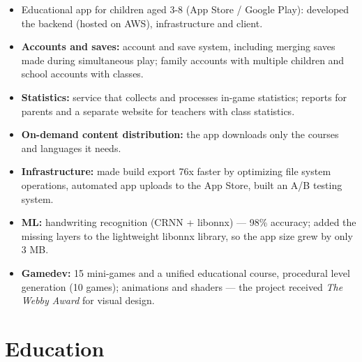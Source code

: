 \documentclass{dodiresume}
\begin{document}

\begin{itemize}
\item Educational app for children aged 3-8 (App Store / Google Play): developed the backend (hosted on AWS), infrastructure and client.
\item \textbf{Accounts and saves:} account and save system, including merging saves made during simultaneous play; family accounts with multiple children and school accounts with classes.
\item \textbf{Statistics:} service that collects and processes in-game statistics; reports for parents and a separate website for teachers with class statistics.
\item \textbf{On-demand content distribution:} the app downloads only the courses and languages it needs.
\item \textbf{Infrastructure:} made build export 76x faster by optimizing file system operations, automated app uploads to the App Store, built an A/B testing system.
\item \textbf{ML:} handwriting recognition (CRNN + libonnx) — 98\% accuracy; added the missing layers to the lightweight libonnx library, so the app size grew by only 3 MB.
\item \textbf{Gamedev:} 15 mini-games and a unified educational course, procedural level generation (10 games); animations and shaders — the project received \textit{The Webby Award} for visual design.
\end{itemize}

\section{Education}


\vspace{0.3cm}


\vspace{0.3cm}
\end{document}
